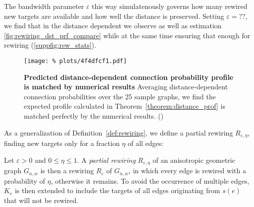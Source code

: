 The bandwidth parameter $\varepsilon$ this way simulatenously governs
how many rewired new targets are available and how well the distance
is preserved. Setting $\varepsilon = ??$, we find that in the distance
dependent we observe as well as estimation
\autoref{fig:rewiring_dst_prf_compare} while at the same time ensuring
that enough for rewiring (\autoref{suppfig:rew_stats}).

\begin{figure}[H]
  \centering
  \texttt{[image: \%
    plots/4f4dfcf1.pdf]} 
  \captionsetup{skip=0pt}
  \caption{\textbf{Predicted distance-dependent connection probability
      profile is matched by numerical results} Averaging
    distance-dependent connection probabilities over the 25 sample
    graphs, we find the expected profile calculated in
    Theorem~\ref{theorem:distance_prof} is matched perfectly by the
    numerical results. () } %
  \label{fig:rewiring_dst_prf_compare}
\end{figure}


As a generalization of Definition~\ref{def:rewiring}, we define a
partial rewiring $R_{\varepsilon, \eta}$, finding new targets only for
a fraction $\eta$ of all edges:

\begin{definition}Let $\varepsilon > 0$ and $0 \leq \eta \leq 1$. A
  \textit{partial rewiring} $R_{\varepsilon,\eta}$ of an anisotropic
  geometric graph $G_{n,w}$ is then a rewiring $R_{\varepsilon}$ of
  $G_{n,w}$, in which every edge is rewired with a probability of
  $\eta$, otherwise it remains. To avoid the occurrence of multiple
  edges, $K_e$ is then extended to include the targets of all edges
  originating from $s(e)$ that will not be rewired.
\end{definition}







 



